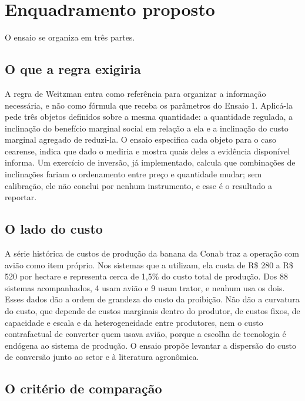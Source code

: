 \section{Enquadramento proposto}
\label{sec:e2-enquadramento}

 O ensaio se
organiza em três partes.

\subsection{O que a regra exigiria}

A regra de Weitzman entra como referência para organizar a informação
necessária, e não como fórmula que receba os parâmetros do Ensaio 1. Aplicá-la
pede três objetos definidos sobre a mesma quantidade: a quantidade regulada, a
inclinação do benefício marginal social em relação a ela e a inclinação do
custo marginal agregado de reduzi-la. O ensaio especifica cada objeto para o
caso cearense, indica que dado o mediria e mostra quais deles a evidência
disponível informa. Um exercício de inversão, já implementado, calcula que
combinações de inclinações fariam o ordenamento entre preço e quantidade mudar;
sem calibração, ele não conclui por nenhum instrumento, e esse é o resultado a
reportar.

\subsection{O lado do custo}

A série histórica de custos de produção da banana da Conab traz a operação com
avião como item próprio. Nos sistemas que a utilizam, ela custa de R\$ 280 a
R\$ 520 por hectare e representa cerca de 1,5\% do custo total de produção.
Dos 88 sistemas acompanhados, 4 usam avião e 9 usam trator, e nenhum usa os
dois. Esses dados dão a ordem de
grandeza do custo da proibição. Não dão a curvatura do custo, que depende de
custos marginais dentro do produtor, de custos fixos, de capacidade e escala e
da heterogeneidade entre produtores, nem o custo contrafactual de converter
quem usava avião, porque a escolha de tecnologia é endógena ao sistema de
produção. O ensaio propõe levantar a dispersão do custo de conversão junto ao
setor e à literatura agronômica.

\subsection{O critério de comparação}

